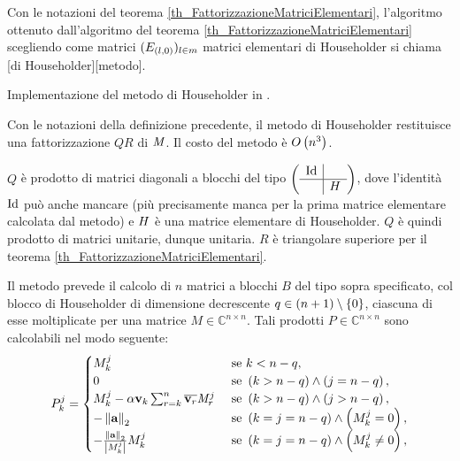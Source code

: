 \begin{Definition}
  Con le notazioni del teorema \ref{th_FattorizzazioneMatriciElementari},
  l'algoritmo ottenuto dall'algoritmo del teorema \ref{th_FattorizzazioneMatriciElementari}
  scegliendo come matrici $(E_{(l,0)})_{l \in m}$ matrici elementari di Householder
  si chiama
  [di Householder][metodo].
\end{Definition}
\begin{listing}
	\caption{Implementazione del metodo di Householder in .}
\end{listing}
\begin{Theorem}
  Con le notazioni della definizione precedente, il metodo di Householder restituisce
  una fattorizzazione $QR$ di $\mathit{M}$. Il costo del metodo \`e $O \left ( n^3 \right )$.
\end{Theorem}
\Proof $Q$ \`e prodotto di matrici diagonali a blocchi del tipo
$\lmatrix
\begin{array}{c|c}
  \Identity &\\
  \hline
  &\HouseholderElementaryMatrix
\end{array}
\rmatrix$, dove l'identit\`a $\Identity$ pu\`o anche mancare (pi\`u precisamente manca per la
prima matrice elementare calcolata dal metodo) e $H$ \`e una matrice
elementare di Householder. $Q$ \`e quindi prodotto di matrici unitarie, dunque unitaria.
$R$ \`e triangolare superiore per il teorema \ref{th_FattorizzazioneMatriciElementari}.
\par Il metodo prevede il calcolo di $n$ matrici a blocchi $B$ del tipo sopra specificato,
col blocco di Householder di dimensione decrescente $q \in (n + 1) \setminus \lbrace 0 \rbrace$,
ciascuna di esse moltiplicate per
una matrice $M \in \mathbb{C}^{n \times n}$. Tali prodotti $P \in \mathbb{C}^{n \times n}$ sono
calcolabili nel modo seguente:
\[
    P_k^j =
    \begin{cases}
      M_k^j&\text{ se }k < n - q,\\
      0&\text{ se }\And{k > n - q}{j = n - q},\\
      M_k^j - \Scalar \Vector_k \sum_{r = k}^n \Conjugate{\Vector_r} \Matrix_r^j&\text{ se }
        \And{k > n - q}{j > n - q},\\
      - \Norm{\VarVarVector}[2]&\text{ se }\And{k = j = n - q}{M_k^j = 0},\\
      - \frac{\Norm{\VarVarVector}[2]}{\AbsoluteValue{M_k^j}}M_k^j&\text{ se }\And{k = j = n - q}{M_k^j \neq 0},
    \end{cases}
\]
